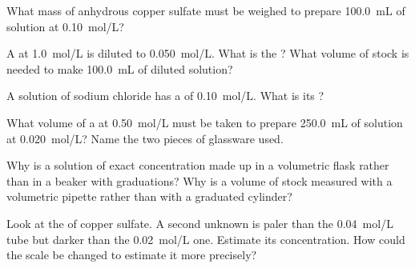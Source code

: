 \begin{exercise}[$\star$]\label{exo:g10:concentration-and-dilution:3}
What mass of anhydrous copper sulfate  must be weighed to
prepare \qty{100.0}{mL} of solution at \qty{0.10}{mol/L}?
\end{exercise}

\begin{exercise}[$\star$]\label{exo:g10:concentration-and-dilution:4}
A  at \qty{1.0}{mol/L} is diluted to \qty{0.050}{mol/L}.
What is the ? What volume of stock is needed to make
\qty{100.0}{mL} of diluted solution?
\end{exercise}

\begin{exercise}[$\star$]\label{exo:g10:concentration-and-dilution:5}
A solution of sodium chloride has a  of
\qty{0.10}{mol/L}. What is its ?
\end{exercise}

\begin{exercise}[$\star\star$]\label{exo:g10:concentration-and-dilution:6}
What volume of a  at \qty{0.50}{mol/L} must be taken to
prepare \qty{250.0}{mL} of solution at \qty{0.020}{mol/L}? Name the two
pieces of glassware used.
\end{exercise}

\begin{exercise}[$\star\star$]\label{exo:g10:concentration-and-dilution:7}
Why is a solution of exact concentration made up in a volumetric flask
rather than in a beaker with graduations? Why is a volume of stock
measured with a volumetric pipette rather than with a graduated
cylinder?
\end{exercise}

\begin{exercise}[$\star\star$]\label{exo:g10:concentration-and-dilution:8}
Look at the  of copper sulfate. A second unknown is
paler than the \qty{0.04}{mol/L} tube but darker than the
\qty{0.02}{mol/L} one. Estimate its concentration. How could the scale
be changed to estimate it more precisely?
\end{exercise}

